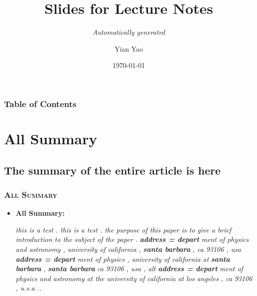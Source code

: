 \documentclass{beamer}%
\begin{document}
%
\normalsize%
\title{Slides for Lecture Notes}%
\subtitle{\textit{Automatically generated}}%
\author{Yian Yao}%
\date{\today}%
\maketitle%
\begin{frame}%
\frametitle{Table of Contents}%
\tableofcontents%
\end{frame}%
\section{All Summary}%
\subsection{The summary of the entire article is here}%
\begin{frame}%
\frametitle{\textsc{All Summary}}%
\begin{itemize}%
\item{\bf{All Summary:}}%
\begin{itemize}%
\textit{this is a test .   this is a test .      the purpose of this paper is to give a brief introduction to the subject of the paper .       }%
\textbf{\textit{address = depart}}%
\textit{ment of physics and astronomy , university of california , }%
\textbf{\textit{santa barbara}}%
\textit{ , ca 93106 , usa     }%
\textbf{\textit{address = depart}}%
\textit{ment of physics , university of california at }%
\textbf{\textit{santa barbara}}%
\textit{ , }%
\textbf{\textit{santa barbara}}%
\textit{ ca 93106 , usa , alt}%
\textbf{\textit{address = depart}}%
\textit{ment of physics and astronomy at the university of california at los angeles , ca 93106 , u.s.a ..}%
\end{itemize}%
\end{itemize}%
\end{frame}%
\end{document}
